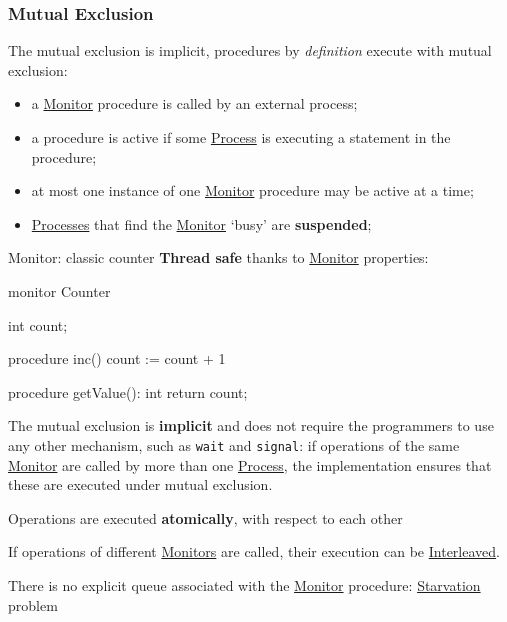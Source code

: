 \subsubsection{Mutual Exclusion}\label{sub:pi_mn_mutual_exclusion} %
The mutual exclusion is implicit, procedures by \textit{definition} execute with mutual exclusion:
\begin{itemize}
    \item a \hyperref[def:monitor]{Monitor} procedure is called by an external process;
    \item a procedure is active if some \hyperref[def:process]{Process} is executing a statement in the procedure;
    \item at most one instance of one \hyperref[def:monitor]{Monitor} procedure may be active at a time;
    \item \hyperref[def:process]{Processes} that find the \hyperref[def:monitor]{Monitor} `busy' are \textbf{suspended};
\end{itemize}
\begin{example}{Monitor: classic counter}{}
    \textbf{Thread safe} thanks to \hyperref[def:monitor]{Monitor} properties:
    \begin{codeblock}{}
    monitor Counter {
        int count;

        procedure inc() {
            count := count + 1
        }

        procedure getValue(): int {
            return count;
        }
    }
    \end{codeblock}
\end{example}
\begin{remark}{}{}
    The mutual exclusion is \textbf{implicit} and does not require the programmers to use any other mechanism, such as \texttt{wait} and \texttt{signal}: if operations of the same \hyperref[def:monitor]{Monitor} are called by more than one \hyperref[def:process]{Process}, the implementation ensures that these are executed under mutual exclusion.
    \begin{note}
        Operations are executed \textbf{atomically}, with respect to each other
    \end{note}
    If operations of different \hyperref[def:monitor]{Monitors} are called, their execution can be \hyperref[def:interleaving]{Interleaved}.
    \begin{note}
        There is no explicit queue associated with the \hyperref[def:monitor]{Monitor} procedure: \hyperref[def:starvation]{Starvation} problem
    \end{note}
\end{remark}
%
